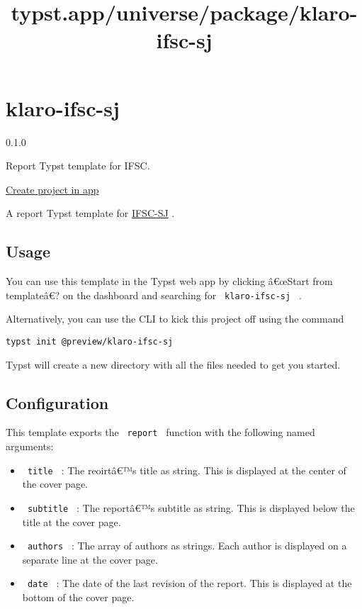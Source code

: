\title{typst.app/universe/package/klaro-ifsc-sj}

\label{banner}
\label{template-thumbnail}

\section{klaro-ifsc-sj}\label{klaro-ifsc-sj}

{ 0.1.0 }

Report Typst template for IFSC.

\href{/app?template=klaro-ifsc-sj&version=0.1.0}{Create project in app}

\label{readme}
A report Typst template for \href{https://sj.ifsc.edu.br/}{IFSC-SJ} .

\subsection{Usage}\label{usage}

You can use this template in the Typst web app by clicking â€œStart from
templateâ€? on the dashboard and searching for
\texttt{\ klaro-ifsc-sj\ } .

Alternatively, you can use the CLI to kick this project off using the
command

\begin{verbatim}
typst init @preview/klaro-ifsc-sj
\end{verbatim}

Typst will create a new directory with all the files needed to get you
started.

\subsection{Configuration}\label{configuration}

This template exports the \texttt{\ report\ } function with the
following named arguments:

\begin{itemize}
\tightlist
\item
  \texttt{\ title\ } : The reoirtâ€™s title as string. This is displayed
  at the center of the cover page.
\item
  \texttt{\ subtitle\ } : The reportâ€™s subtitle as string. This is
  displayed below the title at the cover page.
\item
  \texttt{\ authors\ } : The array of authors as strings. Each author is
  displayed on a separate line at the cover page.
\item
  \texttt{\ date\ } : The date of the last revision of the report. This
  is displayed at the bottom of the cover page.
\end{itemize}

